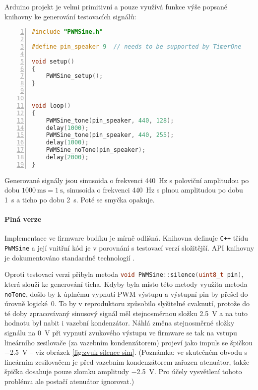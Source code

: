 Arduino projekt  je velmi primitivní a pouze využívá funkce
výše popsané knihovny ke generování testovacích signálů:
\begin{lstlisting}[language=C++,numbers=left]
#include "PWMSine.h"

#define pin_speaker 9  // needs to be supported by TimerOne

void setup()
{
    PWMSine_setup();
}


void loop()
{
    PWMSine_tone(pin_speaker, 440, 128);
    delay(1000);
    PWMSine_tone(pin_speaker, 440, 255);
    delay(1000);
    PWMSine_noTone(pin_speaker);
    delay(2000);
}
\end{lstlisting}
Generované signály jsou sinusoida o frekvenci \SI{440}{\hertz} s poloviční
amplitudou po dobu $\SI{1000}{\milli\second} = \SI{1}{\second}$, sinusoida
o frekvenci \SI{440}{\hertz} s plnou amplitudou po dobu \SI{1}{\second} a ticho
po dobu \SI{2}{\second}. Poté se smyčka opakuje.


\paragraph{Plná verze}
Implementace ve firmware budíku je mírně odlišná. Knihovna 
definuje \texttt{C++} třídu \texttt{PWMSine} a její vnitřní kód je v porovnání
s testovací verzí složitější. API knihovny je dokumentováno standardně
technologií .

Oproti testovací verzi přibyla metoda
\lstinline[language=C++]!void PWMSine::silence(uint8_t pin)!, která slouží ke
generování ticha. Kdyby byla místo této metody využita metoda \texttt{noTone},
došlo by k úplnému vypnutí PWM výstupu a výstupní pin by přešel do úrovně
logické~0. To by v reproduktoru způsobilo slyšitelné cvaknutí, protože do té
doby zpracovávaný sinusový signál měl stejnosměrnou složku \SI{2,5}{\volt} a na
tuto hodnotu byl nabit i vazební kondenzátor. Náhlá změna stejnosměrné složky
signálu na \SI{0}{\volt} při vypnutí zvukového výstupu ve firmware se tak na
vstupu lineárního zesilovače (za vazebním kondenzátorem) projeví jako impuls se
špičkou \SI{-2,5}{\volt} -- viz obrázek \vref{fig:zvuk silence sim}. (Poznámka:
ve skutečném obvodu s lineárním zesilovačem je před vazebním kondenzátorem
zařazen atenuátor, takže špička dosahuje pouze zlomku amplitudy
\SI{-2,5}{\volt}. Pro účely vysvětlení tohoto problému ale postačí atenuátor
ignorovat.)

